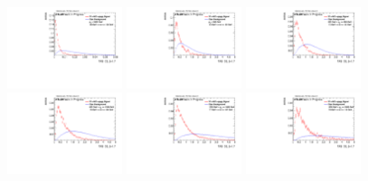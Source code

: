 \begin{figure}[H]
\includegraphics[width=0.3\textwidth]{sascha_input/Appendix/Distributions/w/distributions/beta17/h_assisted_tj_C2_17_bin6.pdf} 
\bigskip
\includegraphics[width=0.3\textwidth]{sascha_input/Appendix/Distributions/w/distributions/beta17/h_assisted_tj_D2_17_bin1.pdf} \hspace{1mm}
\includegraphics[width=0.3\textwidth]{sascha_input/Appendix/Distributions/w/distributions/beta17/h_assisted_tj_D2_17_bin2.pdf} \hspace{1mm}
\includegraphics[width=0.3\textwidth]{sascha_input/Appendix/Distributions/w/distributions/beta17/h_assisted_tj_D2_17_bin3.pdf} 
\bigskip
\includegraphics[width=0.3\textwidth]{sascha_input/Appendix/Distributions/w/distributions/beta17/h_assisted_tj_D2_17_bin4.pdf} \hspace{1mm}
\includegraphics[width=0.3\textwidth]{sascha_input/Appendix/Distributions/w/distributions/beta17/h_assisted_tj_D2_17_bin5.pdf} \hspace{1mm}

\end{figure}

